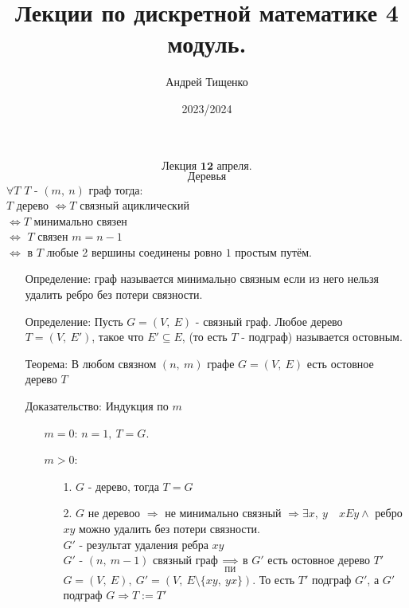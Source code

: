\documentclass[12pt, letterpaper, twoside]{article}
\title{Лекции по дискретной математике 4 модуль.}
\author{Андрей Тищенко}
\date{2023/2024}
\newcommand{\Underl}[1]{$\underline{\text{#1}}$}
\begin{document}
    \maketitle
    \[\textbf{Лекция 12 апреля.}\]
    \[\text{Деревья}\]
    $\forall T$ $T$ - $(m,\ n)$ граф тогда:\\
    $T$ дерево $\Leftrightarrow T$ связный ациклический\\
    $\Leftrightarrow T$ минимально связен\\
    $\Leftrightarrow$ $T$ связен $m = n - 1$\\
    $\Leftrightarrow$ в $T$ любые 2 вершины соединены ровно $1$ простым путём.\\
    \begin{enumerate}
        \item[Определение:] граф называется \Underl{минимально связным} если из него нельзя удалить ребро без потери связности.
        \item[Определение:] Пусть $G = (V,\ E)$ - связный граф. Любое дерево $T = (V,\ E')$, такое что $E' \subseteq E$, (то есть $T$ - подграф) называется остовным.
        \item[Теорема:] В любом связном $(n,\ m)$ графе $G = (V,\ E)$ есть остовное дерево $T$
        \item[Доказательство:] Индукция по $m$\\
        \begin{enumerate}
            \item[$m = 0$:] $n = 1,\ T = G$.
            \item[$m > 0$:]
            \begin{enumerate}
                \item[1.] $G$ - дерево, тогда $T = G$
                \item[2.] $G$ не деревоо $\Rightarrow$  не минимально связный $\Rightarrow \exists x,\ y\quad xEy \wedge$ ребро $xy$ можно удалить без потери связности.\\
                $G'$ - результат удаления ребра $xy$\\
                $G'$ - $(n,\ m - 1)$ связный граф $\underset{\text{ПИ}}{\Rightarrow}$ в $G'$ есть остовное дерево $T'$\\
                $G = (V,\ E),\ G' = (V,\ E\setminus\{xy,\ yx\})$. То есть $T'$ подграф $G'$, а $G'$ подграф $G\Rightarrow T:= T'$\\
            \end{enumerate}  
        \end{enumerate}  
    \end{enumerate}
\end{document}

